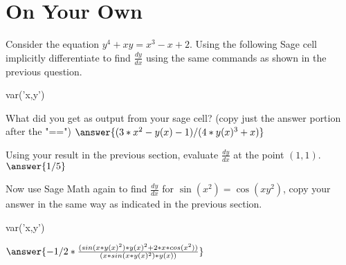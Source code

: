 \documentclass{ximera}
\begin{document}
\section{On Your Own}
Consider the equation $y^4+xy=x^3-x+2$. Using the following Sage cell implicitly differentiate to find $\frac{dy}{dx}$ using the same commands as shown in the previous question.
\begin{onlineOnly}
\begin{sageCell}
var('x,y')
\end{sageCell}
\end{onlineOnly}
\begin{question}
What did you get as output from your sage cell? (copy just the answer portion after the "==") $\answer{(3*x^2 - y(x) - 1)/(4*y(x)^3 + x)}$
\end{question}
\begin{question}
Using your result in the previous section, evaluate $\frac{dy}{dx}$ at the point $(1,1)$.
$\answer{1/5}$
\end{question}
\begin{question}
Now use Sage Math again to find $\frac{dy}{dx}$ for  $\sin(x^2)=\cos(xy^2)$, copy your answer in the same way as indicated in the previous section.
\begin{onlineOnly}
\begin{sageCell}
var('x,y')
\end{sageCell}
\end{onlineOnly}
$\answer{-1/2*\frac{(sin(x*y(x)^2)*y(x)^2 + 2*x*cos(x^2))}{(x*sin(x*y(x)^2)*y(x))}}$
\end{question}
\end{document}
